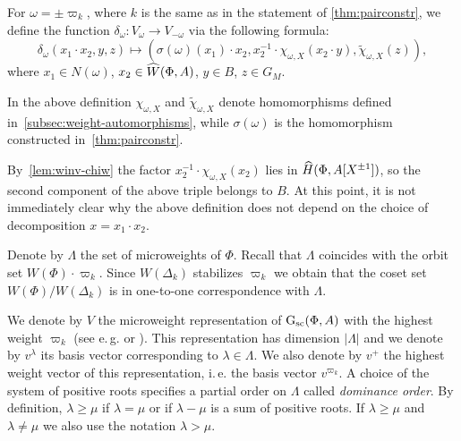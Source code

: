 \begin{dfn} \label{sigma-def}
  For $\omega = \pm \varpi_k$, where $k$ is the same as in the statement of \cref{thm:pairconstr},
  we define the function $\delta_\omega \colon V_\omega \to V_{-\omega}$ via the following formula:
  \begin{equation} \label{eq:sigma-def} \delta_\omega(x_1 \cdot x_2, y, z) \mapsto (\sigma(\omega)(x_1)\cdot x_2, x_2^{-1} \cdot \chi_{\omega, X}(x_2 \cdot y), \widetilde{\chi}_{\omega, X}(z)), \end{equation}
  where $x_1 \in N(\omega)$, $x_2 \in \widehat{W}(\Phi, A)$,  $y \in B$, $z \in G_M$.
\end{dfn}

In the above definition $\chi_{\omega, X}$ and $\widetilde{\chi}_{\omega, X}$ denote homomorphisms defined in~\cref{subsec:weight-automorphisms},
 while $\sigma(\omega)$ is the homomorphism constructed in~\cref{thm:pairconstr}.

By~\cref{lem:winv-chiw} the factor $x_2^{-1} \cdot \chi_{\omega, X}(x_2)$ lies in $\widehat{H}(\Phi, A[X^{\pm 1}])$,
 so the second component of the above triple belongs to $B$.
At this point, it is not immediately clear why the above definition does not depend on the choice of decomposition $x = x_1 \cdot x_2$.

Denote by $\Lambda$ the set of microweights of $\Phi$.
Recall that $\Lambda$ coincides with the orbit set $W(\Phi) \cdot \varpi_k$.
Since $W(\Delta_k)$ stabilizes $\varpi_k$ we obtain that the coset set $W(\Phi)/W(\Delta_k)$ is in one-to-one correspondence with $\Lambda$.

We denote by $V$ the microweight representation of $\operatorname{G}_\mathrm{sc}(\Phi, A)$ with the highest weight $\varpi_k$ (see e.\,g. \cite[\S~2]{Ge17} or \cite[\S~1.1]{V00}).
This representation has dimension $|\Lambda|$ and we denote by $v^\lambda$ its basis vector corresponding to $\lambda \in \Lambda$.
We also denote by $v^+$ the highest weight vector of this representation, i.\,e. the basis vector $v^{\varpi_k}$.
A choice of the system of positive roots specifies a partial order on $\Lambda$ called \textit{dominance order}.
By definition, $\lambda \geq \mu$ if $\lambda = \mu$ or if $\lambda - \mu$ is a sum of positive roots.
If $\lambda \geq \mu$ and $\lambda \neq \mu$ we also use the notation $\lambda > \mu$.

